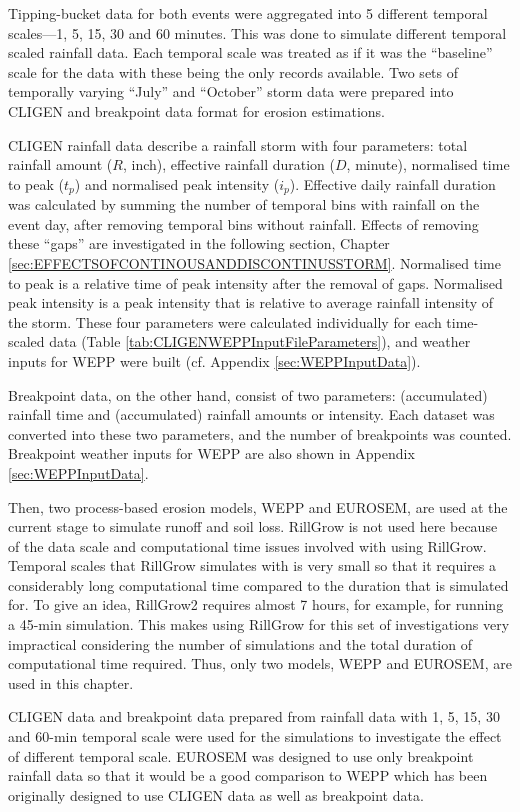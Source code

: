 Tipping-bucket data for both events were aggregated into 5 different temporal
scales---1, 5, 15, 30 and 60 minutes. This was done to simulate different
temporal scaled rainfall data. Each temporal scale was treated as if it was the
``baseline'' scale for the data with these being the only records available. Two
sets of temporally varying ``July'' and ``October'' storm data were prepared
into CLIGEN and breakpoint data format for erosion estimations.

CLIGEN rainfall data describe a rainfall storm with four parameters: total
rainfall amount ($R$, inch), effective rainfall duration ($D$, minute),
normalised time to peak ($t_p$) and normalised peak intensity ($i_p$). Effective
daily rainfall duration was calculated by summing the number of temporal bins
with rainfall on the event day, after removing temporal bins without rainfall.
Effects of removing these ``gaps'' are investigated in the following section,
Chapter \ref{sec:EFFECTSOFCONTINOUSANDDISCONTINUSSTORM}. Normalised time to
peak is a relative time of peak intensity after the removal of gaps.
Normalised peak intensity is a peak intensity that is relative to average
rainfall intensity of the storm. These four parameters were calculated
individually for each time-scaled data (Table
\ref{tab:CLIGENWEPPInputFileParameters}), and weather inputs for WEPP were
built (cf. Appendix \ref{sec:WEPPInputData}).

Breakpoint data, on the other hand, consist of two parameters: (accumulated)
rainfall time and (accumulated) rainfall amounts or intensity. Each dataset was
converted into these two parameters, and the number of breakpoints was counted.
Breakpoint weather inputs for WEPP are also shown in Appendix
\ref{sec:WEPPInputData}.

Then, two process-based erosion models, WEPP and EUROSEM, are used at the
current stage to simulate runoff and soil loss. RillGrow is not used here
because of the data scale and computational time issues involved
with using RillGrow. Temporal scales that RillGrow simulates with is very small
so that it requires a considerably long computational time compared to the
duration that is simulated for. To give an idea, RillGrow2 requires almost 7
hours, for example, for running a 45-min simulation. This makes using RillGrow
for this set of investigations very impractical considering the number of
simulations and the total duration of computational time required. Thus, only
two models, WEPP and EUROSEM, are used in this chapter.

CLIGEN data and breakpoint data prepared from rainfall data with 1, 5, 15,
30 and 60-min temporal scale were used for the simulations to investigate the
effect of different temporal scale.
EUROSEM was designed to use only breakpoint rainfall data so that it would
be a good comparison to WEPP which has been originally designed to use CLIGEN
data as well as breakpoint data.

